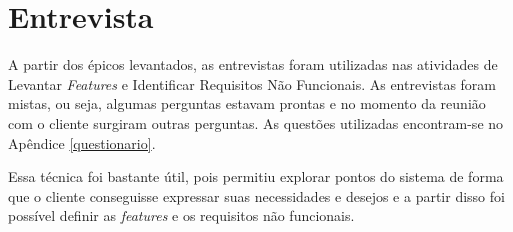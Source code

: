 \section{Entrevista}

A partir dos épicos levantados, as entrevistas foram utilizadas nas atividades de Levantar \textit{Features} e Identificar Requisitos Não Funcionais.
As entrevistas foram mistas, ou seja, algumas perguntas estavam prontas e no momento da reunião com o cliente surgiram
outras perguntas. As questões utilizadas encontram-se no Apêndice \ref{questionario}.

Essa técnica foi bastante útil, pois permitiu explorar pontos do sistema de forma que o cliente conseguisse
expressar suas necessidades e desejos e a partir disso foi possível definir as \textit{features} e os requisitos não funcionais.

